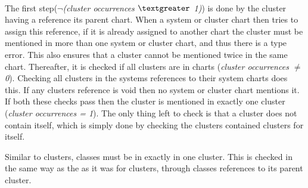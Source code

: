 \paragraph{}
The first step({\footnotesize$\neg$\textit{(cluster occurrences $\textgreater$ 1)}}) is done by the cluster having a reference its parent chart. When a system or cluster chart then tries to assign this reference, if it is already assigned to another chart the cluster must be mentioned in more than one system or cluster chart, and thus there is a type error. This also ensures that a cluster cannot be mentioned twice in the same chart. Thereafter, it is checked if all clusters are in charts ({\footnotesize\textit{cluster occurrences $\neq$ 0}}). Checking all clusters in the systems references to their system charts does this. If any clusters reference is void then no system or cluster chart mentions it. If both these checks pass then the cluster is mentioned in exactly one cluster ({\footnotesize\textit{cluster occurrences = 1}}). The only thing left to check is that a cluster does not contain itself, which is simply done by checking the clusters contained clusters for itself. 

Similar to clusters, classes must be in exactly in one cluster. This is checked in the same way as the as it was for clusters, through classes references to its parent cluster.